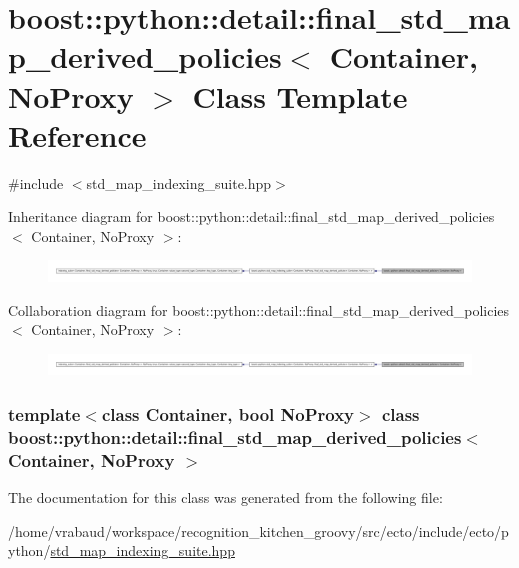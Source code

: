 \hypertarget{classboost_1_1python_1_1detail_1_1final__std__map__derived__policies}{\section{boost\-:\-:python\-:\-:detail\-:\-:final\-\_\-std\-\_\-map\-\_\-derived\-\_\-policies$<$ \-Container, \-No\-Proxy $>$ \-Class \-Template \-Reference}
\label{classboost_1_1python_1_1detail_1_1final__std__map__derived__policies}
}


{\ttfamily \#include $<$std\-\_\-map\-\_\-indexing\-\_\-suite.\-hpp$>$}



\-Inheritance diagram for boost\-:\-:python\-:\-:detail\-:\-:final\-\_\-std\-\_\-map\-\_\-derived\-\_\-policies$<$ \-Container, \-No\-Proxy $>$\-:\nopagebreak
\begin{figure}[H]
\begin{center}
\leavevmode
\includegraphics[width=350pt]{classboost_1_1python_1_1detail_1_1final__std__map__derived__policies__inherit__graph}
\end{center}
\end{figure}


\-Collaboration diagram for boost\-:\-:python\-:\-:detail\-:\-:final\-\_\-std\-\_\-map\-\_\-derived\-\_\-policies$<$ \-Container, \-No\-Proxy $>$\-:\nopagebreak
\begin{figure}[H]
\begin{center}
\leavevmode
\includegraphics[width=350pt]{classboost_1_1python_1_1detail_1_1final__std__map__derived__policies__coll__graph}
\end{center}
\end{figure}
\subsubsection*{template$<$class Container, bool \-No\-Proxy$>$ class boost\-::python\-::detail\-::final\-\_\-std\-\_\-map\-\_\-derived\-\_\-policies$<$ Container, No\-Proxy $>$}



\-The documentation for this class was generated from the following file\-:\begin{DoxyCompactItemize}
\item 
/home/vrabaud/workspace/recognition\-\_\-kitchen\-\_\-groovy/src/ecto/include/ecto/python/\hyperlink{std__map__indexing__suite_8hpp}{std\-\_\-map\-\_\-indexing\-\_\-suite.\-hpp}\end{DoxyCompactItemize}
